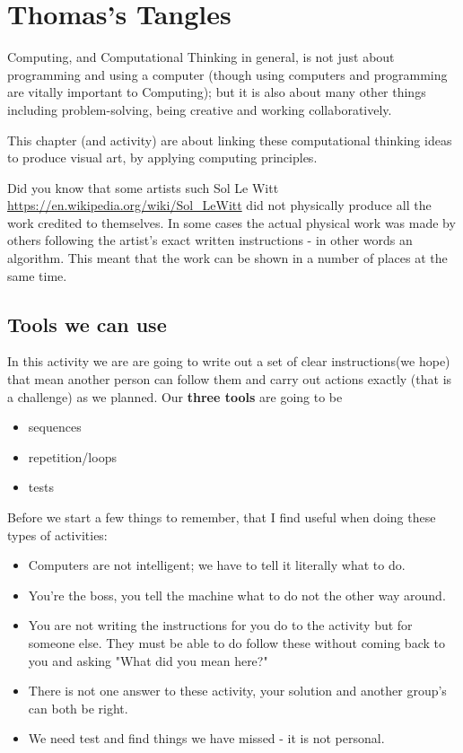 
\chapter{Thomas's Tangles}


Computing, and Computational Thinking in general,  is not just about programming and using a computer (though using computers and  programming are vitally important to Computing); but it is also about many other things including problem-solving, being creative and working collaboratively.

This chapter (and activity) are about linking these computational thinking ideas to produce visual art, by applying computing principles. 

Did you know that some artists such Sol Le Witt \url{https://en.wikipedia.org/wiki/Sol_LeWitt} did not physically produce all the work credited to themselves. In some cases the actual physical work was made by others following the artist's exact written instructions - in other words an algorithm. This meant that the work can be shown in a number of places at the same time.

\section{Tools we can use}

In this activity we are are going to write out a set of clear instructions(we hope) that mean another person can follow them and carry out actions exactly (that is a challenge) as we planned. Our \textbf{three tools} are going to be 
\begin{itemize}
    \item sequences
    \item repetition/loops
    \item tests
\end{itemize}


Before we start a few things to remember, that I find useful when doing these types of activities:
\begin{itemize}
    \item Computers are not intelligent; we have to tell it literally what to do.
    \item You're the boss, you tell the machine what to do not the other way around.
    \item You are not writing the instructions for you do to the activity but for someone else. They must be able to do follow these without coming back to you and asking "What did you mean here?"
    \item There is not one answer to these activity, your solution and another group's can both be right.  
    \item We need test and find things we have missed - it is not personal.
\end{itemize}

